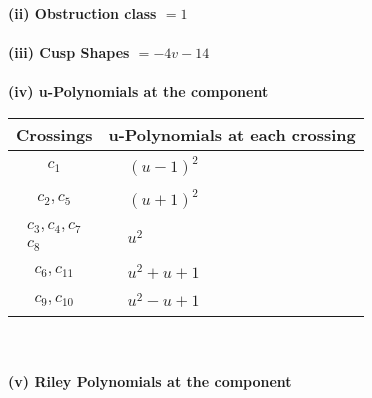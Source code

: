 \documentclass[1p]{elsarticle_modified}
\theoremstyle{definition}
\begin{document}
\flushleft \textbf{(ii) Obstruction class $= 1$}\\~\\
\flushleft \textbf{(iii) Cusp Shapes $= -4 v-14$}\\~\\
\newpage\renewcommand{\arraystretch}{1}
\flushleft \textbf{(iv) u-Polynomials at the component}\newline \\
\begin{tabular}{m{50pt}|m{274pt}}
Crossings & \hspace{64pt}u-Polynomials at each crossing \\
\hline $$\begin{aligned}c_{1}\end{aligned}$$&$\begin{aligned}
&(u-1)^2
\end{aligned}$\\
\hline $$\begin{aligned}c_{2},c_{5}\end{aligned}$$&$\begin{aligned}
&(u+1)^2
\end{aligned}$\\
\hline $$\begin{aligned}c_{3},c_{4},c_{7}\\c_{8}\end{aligned}$$&$\begin{aligned}
&u^2
\end{aligned}$\\
\hline $$\begin{aligned}c_{6},c_{11}\end{aligned}$$&$\begin{aligned}
&u^2+u+1
\end{aligned}$\\
\hline $$\begin{aligned}c_{9},c_{10}\end{aligned}$$&$\begin{aligned}
&u^2- u+1
\end{aligned}$\\
\hline
\end{tabular}\\~\\
\newpage\renewcommand{\arraystretch}{1}
\flushleft \textbf{(v) Riley Polynomials at the component}\newline \\
\end{document}
